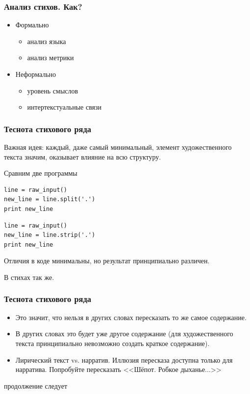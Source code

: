 \documentclass{beamer}
\begin{document}

\begin{frame}
\frametitle{Анализ стихов. Как?}


\begin{itemize}
\item Формально
\begin{itemize}
\item анализ языка
\item анализ метрики
\end{itemize} 
\item Неформально
\begin{itemize}
\item уровень смыслов
\item интертекстуальные связи
\end{itemize} 
\end{itemize}

\end{frame}


\begin{frame}[fragile]
\frametitle{Теснота стихового ряда}



Важная идея: каждый, даже самый минимальный, элемент художественного текста значим, оказывает влияние на всю структуру.

Сравним две программы

\begin{lstlisting}[label=example-code,caption=Первая программа]
line = raw_input()
new_line = line.split('.')
print new_line
\end{lstlisting}

\begin{lstlisting}[label=example-code2,caption=Вторая программа]
line = raw_input()
new_line = line.strip('.')
print new_line
\end{lstlisting}

Отличия в коде минимальны, но результат принципиально различен.

В стихах так же.

\end{frame}




\begin{frame}
\frametitle{Теснота стихового ряда}

\begin{itemize}
\item Это значит, что нельзя в других словах пересказать то же самое содержание.
\item В других словах это будет уже другое содержание (для художественного текста принципиально невозможно создать краткое содержание).
\item Лирический текст vs. нарратив. Иллюзия пересказа доступна только для нарратива. Попробуйте пересказать <<Шёпот. Робкое дыханье...>>
\end{itemize}



\end{frame}



\begin{frame}
\Huge{\centerline{продолжение следует}}
\end{frame}

\end{document}
